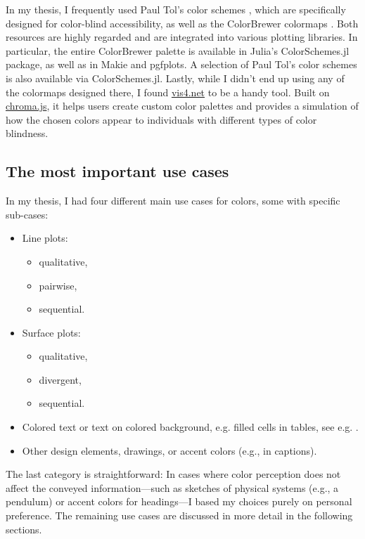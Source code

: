 In my thesis, I frequently used Paul Tol’s color schemes \cite{paultol}, which are specifically designed for color-blind accessibility, as well as the ColorBrewer colormaps \cite{colorbrewer}. Both resources are highly regarded and are integrated into various plotting libraries. In particular, the entire ColorBrewer palette is available in Julia’s ColorSchemes.jl package, as well as in Makie and pgfplots. A selection of Paul Tol's color schemes is also available via ColorSchemes.jl.
Lastly, while I didn’t end up using any of the colormaps designed there, I found \href{https://www.vis4.net/palettes/}{vis4.net} \cite{chromajs} to be a handy tool. Built on \href{https://github.com/gka/chroma.js}{chroma.js}, it helps users create custom color palettes and provides a simulation of how the chosen colors appear to individuals with different types of color blindness.

\subsection{The most important use cases}
In my thesis, I had four different main use cases for colors, some with specific sub-cases:
\begin{itemize}
	\item Line plots:
		\begin{itemize}
			\item qualitative,
			\item pairwise,
			\item sequential. 
		\end{itemize}
	\item Surface plots:
		\begin{itemize}
			\item qualitative,
			\item divergent,
			\item sequential. 
		\end{itemize}
	\item Colored text or text on colored background, e.g. filled cells in tables, see e.g. .
	\item Other design elements, drawings, or accent colors (e.g., in captions).
\end{itemize}
The last category is straightforward: In cases where color perception does not affect the conveyed information---such as sketches of physical systems (e.g., a pendulum) or accent colors for headings---I based my choices purely on personal preference. The remaining use cases are discussed in more detail in the following sections.

